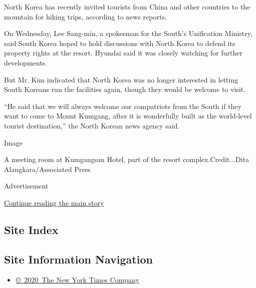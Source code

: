 North Korea has recently invited tourists from China and other countries
to the mountain for hiking trips, according to news reports.

On Wednesday, Lee Sang-min, a spokesman for the South's Unification
Ministry, said South Korea hoped to hold discussions with North Korea to
defend its property rights at the resort. Hyundai said it was closely
watching for further developments.​

But ​Mr. Kim indicated that North Korea was no longer interested in
letting South Koreans run the facilities​ again, though they would be
welcome to visit​.

``He said that we will always welcome our compatriots from the South if
they want to come to Mount Kumgang, after it is wonderfully built as the
world-level tourist destination,'' the North Korean news agency said.

Image

A meeting room at Kumgangsan Hotel, part of the resort
complex.Credit...Dita Alangkara/Associated Press

Advertisement

\protect\hyperlink{after-bottom}{Continue reading the main story}

\hypertarget{site-index}{%
\subsection{Site Index}\label{site-index}}

\hypertarget{site-information-navigation}{%
\subsection{Site Information
Navigation}\label{site-information-navigation}}

\begin{itemize}
\tightlist
\item
  \href{https://help.nytimes3xbfgragh.onion/hc/en-us/articles/115014792127-Copyright-notice}{©~2020~The
  New York Times Company}
\end{itemize}

